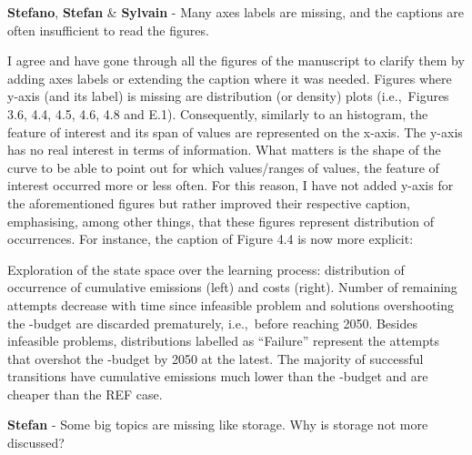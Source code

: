 \documentclass[12pt,a4paper]{article}
\def\ie{i.e.,\ }
\begin{document}
\begin{mdframed}[style=comment] %
{\color{orange} \textbf{Stefano}}, {\color{teal} \textbf{Stefan}} \& {\color{purple} \textbf{Sylvain}} - Many axes labels are missing, and the captions are often insufficient to read the figures. 
\end{mdframed}

\noindent I agree and have gone through all the figures of the manuscript to clarify them by adding axes labels or extending the caption where it was needed. Figures where y-axis (and its label) is missing are distribution (or density) plots (\ie Figures 3.6, 4.4, 4.5, 4.6, 4.8 and E.1).  Consequently, similarly to an histogram, the feature of interest and its span of values are represented on the x-axis. The y-axis has no real interest in terms of information. What matters is the shape of the curve to be able to point out for which values/ranges of values, the feature of interest occurred more or less often.  For this reason, I have not added y-axis for the aforementioned figures but rather improved their respective caption, emphasising, among other things, that these figures represent distribution of occurrences. For instance, the caption of {\color{blue}Figure 4.4} is now more explicit:

\begin{mdframed}[style=manuscript] %
Exploration of the state space over the learning process: distribution of occurrence of cumulative emissions (left) and costs (right). Number of remaining attempts decrease with time since infeasible problem and solutions overshooting the -budget are discarded prematurely, \ie before reaching 2050. Besides infeasible problems, distributions labelled as ``Failure'' represent the attempts that overshot the -budget by 2050 at the latest. The majority of successful transitions have cumulative emissions much lower than the -budget and are cheaper than the REF case. 
\end{mdframed}

\begin{mdframed}[style=comment] %
{\color{teal} \textbf{Stefan}} - Some big topics are missing like storage. Why is storage not more discussed? 
\end{mdframed}
\end{document}
